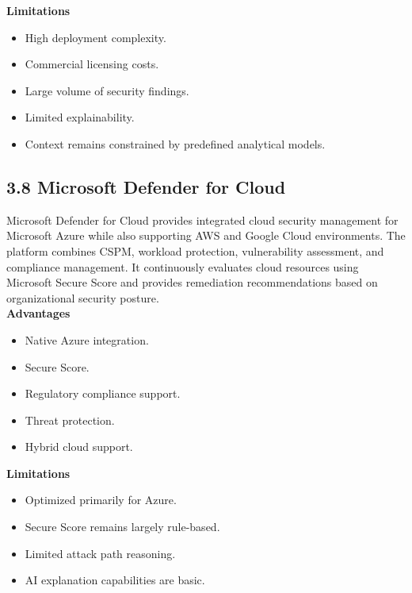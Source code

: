\textbf{Limitations}

\begin{itemize}
\tightlist
\item
  High deployment complexity.\\
\item
  Commercial licensing costs.\\
\item
  Large volume of security findings.\\
\item
  Limited explainability.\\
\item
  Context remains constrained by predefined analytical models.
\end{itemize}

\subsection{3.8 Microsoft Defender for Cloud}

Microsoft Defender for Cloud provides integrated cloud security management for Microsoft Azure while also supporting AWS and Google Cloud environments. The platform combines CSPM, workload protection, vulnerability assessment, and compliance management. It continuously evaluates cloud resources using Microsoft Secure Score and provides remediation recommendations based on organizational security posture.\\
\textbf{Advantages}

\begin{itemize}
\tightlist
\item
  Native Azure integration.\\
\item
  Secure Score.\\
\item
  Regulatory compliance support.\\
\item
  Threat protection.\\
\item
  Hybrid cloud support.
\end{itemize}

\textbf{Limitations}

\begin{itemize}
\tightlist
\item
  Optimized primarily for Azure.\\
\item
  Secure Score remains largely rule-based.\\
\item
  Limited attack path reasoning.\\
\item
  AI explanation capabilities are basic.
\end{itemize}

